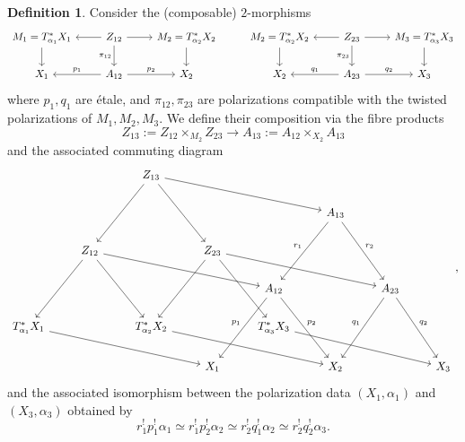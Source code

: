 \documentclass[11pt, a4paper]{amsart}
\numberwithin{equation}{section}
\theoremstyle{definition}
\newtheorem{definition}[theorem]{Definition}
\theoremstyle{remark}
\renewcommand{\to}{\longrightarrow}
\begin{document}
\begin{definition}
    Consider the (composable) $2$-morphisms 
$$
\begin{tikzcd}
	{M_1 = T^*_{\alpha_1}X_1} & {Z_{12}} & {M_2 = T^*_{\alpha_2}X_2} & {M_2 = T^*_{\alpha_2}X_2} & {Z_{23}} & {M_3 = T^*_{\alpha_3}X_3} \\
	{X_1} & {A_{12}} & {X_2} & {X_2} & {A_{23}} & {X_3}
	\arrow[from=1-1, to=2-1]
	\arrow[from=1-2, to=1-1]
	\arrow[from=1-2, to=1-3]
	\arrow["{\pi_{12}}"', from=1-2, to=2-2]
	\arrow[from=1-3, to=2-3]
	\arrow[from=1-4, to=2-4]
	\arrow[from=1-5, to=1-4]
	\arrow[from=1-5, to=1-6]
	\arrow["{\pi_{23}}"', from=1-5, to=2-5]
	\arrow[from=1-6, to=2-6]
	\arrow["{p_1}"', from=2-2, to=2-1]
	\arrow["{p_2}", from=2-2, to=2-3]
	\arrow["{q_1}"', from=2-5, to=2-4]
	\arrow["{q_2}", from=2-5, to=2-6]
\end{tikzcd}
$$
where $p_1, q_1$ are \'etale, and $\pi_{12}, \pi_{23}$ are polarizations compatible with the twisted polarizations of $M_1, M_2, M_3$. We define their composition via the fibre products
\begin{equation} \label{eq fibre prods comp 2-mor}
Z_{13} := Z_{12} \times_{M_2} Z_{23} \to A_{13} := A_{12} \times_{X_2} A_{13}
\end{equation}
and the associated commuting diagram
\begin{equation} \label{eq commuting diagram for composition}
\begin{tikzcd}
	&&{Z_{13}} &  & &&& \\
    &&&&& {A_{13}} && \\
    & {Z_{12}} && {Z_{23}} &&& \\
	&&&& {A_{12}} && {A_{23}} \\
    {T^*_{\alpha_1}X_1} && {T^*_{\alpha_2}X_2} && {T^*_{\alpha_3}X_3} &&& \\
	&&&{X_1} && {X_2} && {X_3}
	\arrow["{r_1}"', from=2-6, to=4-5]
	\arrow["{r_2}", from=2-6, to=4-7]
	\arrow["{p_1}"', from=4-5, to=6-4]
	\arrow["{p_2}", from=4-5, to=6-6]
	\arrow["{q_1}"', from=4-7, to=6-6]
	\arrow["{q_2}", from=4-7, to=6-8]
%
    \arrow[from=1-3, to=3-2]
	\arrow[from=1-3, to=3-4]
	\arrow[from=3-2, to=5-1]
	\arrow[from=3-2, to=5-3]
	\arrow[from=3-4, to=5-3]
	\arrow[from=3-4, to=5-5]    
%
    \arrow[from=1-3, to=2-6]
	\arrow[from=3-2, to=4-5]
	\arrow[from=3-4, to=4-7]
	\arrow[from=5-1, to=6-4]
	\arrow[from=5-3, to=6-6]
	\arrow[from=5-5, to=6-8]
\end{tikzcd},
\end{equation}
and the associated isomorphism between the polarization data $(X_1, \alpha_1)$ and $(X_3, \alpha_3)$ obtained by 
$$r_1^!p_1^!\alpha_1 \simeq r_1^!p_2^!\alpha_2 \simeq r_2^!q_1^!\alpha_2 \simeq r_2^! q_2^! \alpha_3.$$
\end{definition}
    
\end{document}
